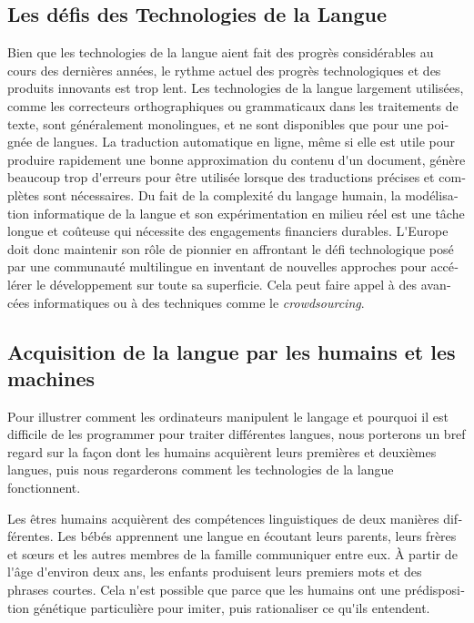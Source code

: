 \begin{french}
\begin{multicols}{2}
\subsection{Les défis des Technologies de la Langue}

Bien que les technologies de la langue aient fait des progrès
considérables au cours des dernières années, le rythme actuel des
progrès technologiques et des produits innovants est trop lent. Les
technologies de la langue largement utilisées, comme les correcteurs
orthographiques ou grammaticaux dans les traitements de texte, sont
généralement monolingues, et ne sont disponibles que pour une poignée
de langues. La traduction automatique en ligne, même si elle est utile
pour produire rapidement une bonne approximation du contenu d{\mbox
 '}un document, génère beaucoup trop d{\mbox '}erreurs pour être
utilisée lorsque des traductions précises et complètes sont
nécessaires. Du fait de la complexité du langage humain, la
modélisation informatique de la langue et son expérimentation en
milieu réel est une tâche longue et coûteuse qui nécessite des
engagements financiers durables. L{\mbox '}Europe doit donc maintenir
son rôle de pionnier en affrontant le défi technologique posé par une
communauté multilingue en inventant de nouvelles approches pour
accélérer le développement sur toute sa superficie. Cela peut faire
appel à des avancées informatiques ou à des techniques comme le {\it
  crowdsourcing}.


\subsection{Acquisition de la langue par les humains et les machines}

Pour illustrer comment les ordinateurs manipulent le langage et pourquoi
il est difficile de les programmer pour traiter différentes langues,
nous porterons un bref regard sur la façon dont les humains acquièrent
leurs premières et deuxièmes langues, puis nous regarderons comment
les technologies de la langue fonctionnent.

Les êtres humains acquièrent des compétences linguistiques de deux
manières différentes. Les bébés apprennent une langue en écoutant
leurs parents, leurs frères et sœurs et les autres membres de la
famille communiquer entre eux. À partir de l{\mbox '}âge d{\mbox
  '}environ deux ans, les enfants produisent leurs premiers mots et
des phrases courtes. Cela n{\mbox '}est possible que parce que les
humains ont une prédisposition génétique particulière pour imiter,
puis rationaliser ce qu{\mbox '}ils entendent.


\end{multicols}
\end{french}
